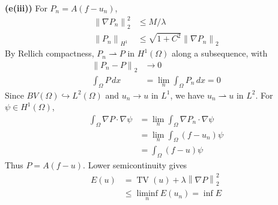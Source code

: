 \documentclass[12pt,letterpaper]{article}
\newcommand{\TV}{\operatorname{TV}}
\newcommand{\norm}[1]{\left\lVert #1\right\rVert}
\newcommand{\partlabel}[1]{\par\medskip\noindent\textbf{(#1)}\enspace}
\begin{document}
\partlabel{e(iii)}
For $P_n=A(f-u_n)$,
\begin{align*}
 \norm{\nabla P_n}_2^2&\leq M/\lambda\\
 \norm{P_n}_{H^1}&\leq\sqrt{1+C^2}\norm{\nabla P_n}_2
\end{align*}
By Rellich compactness, $P_n\rightharpoonup P$ in $H^1(\Omega)$
along a subsequence, with
\begin{align*}
 \norm{P_n-P}_2&\longrightarrow0\\
 \int_\Omega P\,dx&=\lim_n\int_\Omega P_n\,dx=0
\end{align*}
Since $BV(\Omega)\hookrightarrow L^2(\Omega)$ and $u_n\to u$ in
$L^1$, we have $u_n\rightharpoonup u$ in $L^2$.
For $\psi\in H^1(\Omega)$,
\begin{align*}
 \int_\Omega\nabla P\cdot\nabla\psi
 &=\lim_n\int_\Omega\nabla P_n\cdot\nabla\psi\\
 &=\lim_n\int_\Omega(f-u_n)\psi\\
 &=\int_\Omega(f-u)\psi
\end{align*}
Thus $P=A(f-u)$. Lower semicontinuity gives
\begin{align*}
 E(u)&=\TV(u)+\lambda\norm{\nabla P}_2^2\\
 &\leq\liminf_n E(u_n)=\inf E
 \tag*{$\square$}
\end{align*}
\end{document}

